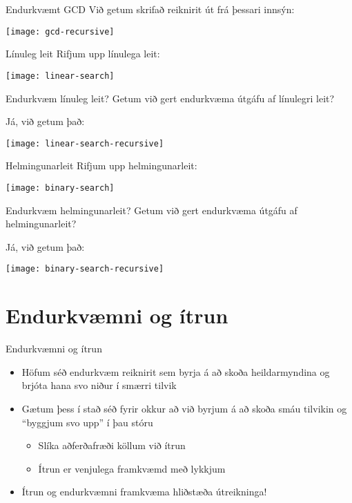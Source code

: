 \documentclass[handout]{beamer}
\begin{document}
\begin{frame}{Endurkvæmt GCD}
Við getum skrifað reiknirit út frá þessari innsýn:
\begin{center}
\texttt{[image: gcd-recursive]}
\end{center}
\end{frame}

\begin{frame}{Línuleg leit}
Rifjum upp línulega leit:
\begin{center}
\texttt{[image: linear-search]}
\end{center}
\end{frame}

\begin{frame}{Endurkvæm línuleg leit?}
Getum við gert endurkvæma útgáfu af línulegri leit?\pause

Já, við getum það:
\begin{center}
\texttt{[image: linear-search-recursive]}
\end{center}
\end{frame}

\begin{frame}{Helmingunarleit}
Rifjum upp helmingunarleit:
\begin{center}
\texttt{[image: binary-search]}
\end{center}
\end{frame}

\begin{frame}{Endurkvæm helmingunarleit?}
Getum við gert endurkvæma útgáfu af helmingunarleit?\pause

Já, við getum það:
\begin{center}
\texttt{[image: binary-search-recursive]}
\end{center}
\end{frame}

\section{Endurkvæmni og ítrun}

\begin{frame}{Endurkvæmni og ítrun}
\begin{itemize}
 \item Höfum séð endurkvæm reiknirit sem byrja á að skoða heildarmyndina og brjóta hana svo niður í smærri tilvik
 \item Gætum þess í stað séð fyrir okkur að við byrjum á að skoða smáu tilvikin og ``byggjum svo upp'' í þau stóru
 \begin{itemize}
  \item Slíka aðferðafræði köllum við ítrun
  \item Ítrun er venjulega framkvæmd með lykkjum
 \end{itemize}
 \item Ítrun og endurkvæmni framkvæma hliðstæða útreikninga!
\end{itemize}
\end{frame}
\end{document}

